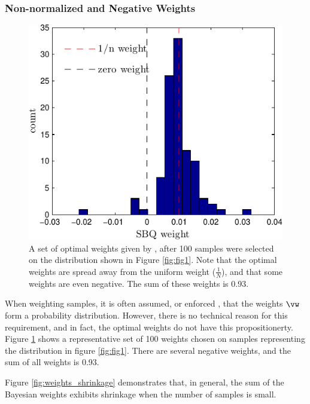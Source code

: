 \subsubsection{Non-normalized and Negative Weights}

\begin{figure}
\centering
\includegraphics[width=\columnwidth]{figs/herding/weights_v1_n100}
\caption{A set of optimal weights given by \bq{}, after 100 \sbq{} samples were selected on the distribution shown in Figure \ref{fig:fig1}.  Note that the optimal weights are spread away from the uniform weight ($\frac{1}{N}$), and that some weights are even negative.  The sum of these weights is 0.93.}
\label{fig:weights100}
\end{figure}

When weighting samples, it is often assumed, or enforced \citep[as in][]{bach2012equivalence,Song2008}, that the weights $\vw$ form a probability distribution.  However, there is no technical reason for this requirement, and in fact, the optimal weights do not have this propositionerty.  Figure \ref{fig:weights100} shows a representative set of 100 \bq{} weights chosen on samples representing the distribution in figure \ref{fig:fig1}.  There are several negative weights, and the sum of all weights is 0.93.

Figure \ref{fig:weights_shrinkage} demonstrates that, in general, the sum of the Bayesian weights exhibits shrinkage when the number of samples is small.

